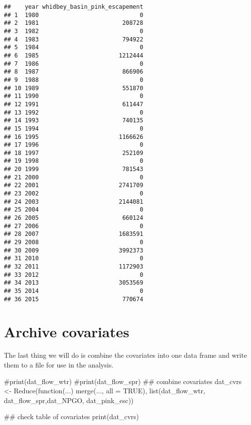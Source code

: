 \documentclass[11pt,]{article}
\newenvironment{Shaded}{}{}
\newcommand{\KeywordTok}[1]{\textcolor[rgb]{0.00,0.00,1.00}{#1}}
\newcommand{\DataTypeTok}[1]{#1}
\newcommand{\StringTok}[1]{\textcolor[rgb]{0.00,0.50,0.50}{#1}}
\newcommand{\CommentTok}[1]{\textcolor[rgb]{0.00,0.50,0.00}{#1}}
\newcommand{\OtherTok}[1]{\textcolor[rgb]{1.00,0.25,0.00}{#1}}
\newcommand{\ControlFlowTok}[1]{\textcolor[rgb]{0.00,0.00,1.00}{#1}}
\newcommand{\NormalTok}[1]{#1}
\begin{document}
\begin{verbatim}
##    year whidbey_basin_pink_escapement
## 1  1980                             0
## 2  1981                        208728
## 3  1982                             0
## 4  1983                        794922
## 5  1984                             0
## 6  1985                       1212444
## 7  1986                             0
## 8  1987                        866906
## 9  1988                             0
## 10 1989                        551870
## 11 1990                             0
## 12 1991                        611447
## 13 1992                             0
## 14 1993                        740135
## 15 1994                             0
## 16 1995                       1166626
## 17 1996                             0
## 18 1997                        252109
## 19 1998                             0
## 20 1999                        781543
## 21 2000                             0
## 22 2001                       2741709
## 23 2002                             0
## 24 2003                       2144081
## 25 2004                             0
## 26 2005                        660124
## 27 2006                             0
## 28 2007                       1683591
## 29 2008                             0
## 30 2009                       3992373
## 31 2010                             0
## 32 2011                       1172903
## 33 2012                             0
## 34 2013                       3053569
## 35 2014                             0
## 36 2015                        770674
\end{verbatim}

\section{Archive covariates}\label{archive-covariates}

The last thing we will do is combine the covariates into one data frame
and write them to a file for use in the analysis.

\begin{Shaded}
\begin{Highlighting}[]
\CommentTok{#print(dat_flow_wtr)}
\CommentTok{#print(dat_flow_spr)}
\NormalTok{## combine covariates}
\NormalTok{dat_cvrs <-}\StringTok{ }\KeywordTok{Reduce}\NormalTok{(}\ControlFlowTok{function}\NormalTok{(...) }\KeywordTok{merge}\NormalTok{(..., }\DataTypeTok{all =} \OtherTok{TRUE}\NormalTok{),}
                   \KeywordTok{list}\NormalTok{(dat_flow_wtr,}
\NormalTok{                        dat_flow_spr,dat_NPGO,}
\NormalTok{                        dat_pink_esc))}

\NormalTok{## check table of covariates}
\KeywordTok{print}\NormalTok{(dat_cvrs)}
\end{Highlighting}
\end{Shaded}
\end{document}
